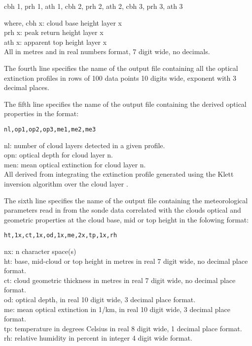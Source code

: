 \begin{center}
cbh 1, prh 1, ath 1, cbh 2, prh 2, ath 2, cbh 3, prh 3, ath 3
\end{center}
\noindent
where,
\noindent
cbh x: cloud base height layer x\\
prh x: peak return height layer x\\
ath x: apparent top height layer x\\

All in metres and in real numbers format, 7 digit wide, no decimals.

The fourth line specifies the name of the output file containing all
the optical extinction profiles in rows of 100 data points 10 digits
wide, exponent with 3 decimal places.

The fifth line specifies the name of the output file containing the
derived optical properties in the format:

\begin{center}
	{\tt nl,op1,op2,op3,me1,me2,me3}
\end{center}
\noindent
nl: number of cloud layers detected in a given profile.\\
opn: optical depth for cloud layer n.\\
men: mean optical extinction for cloud layer n.\\

All derived from integrating the extinction profile 
generated using the Klett inversion algorithm over the cloud
layer \cite{jdk1}. 

The sixth line specifies the name of the output file containing the
meteorological parameters read in from the sonde data
correlated with the clouds optical and geometric properties at the cloud
base, mid or top height in the folowing format:

\begin{center}
		{\tt ht,1x,ct,1x,od,1x,me,2x,tp,1x,rh}
\end{center}
\noindent
nx: n character space(s)\\
ht: base, mid-cloud or top height in metres in real 7 digit wide, 
no decimal place format.\\
ct: cloud geometric thickness in metres in real 7 digit wide, 
    no decimal place format.\\
od: optical depth, in real 10 digit wide, 3 decimal place format.\\
me: mean optical extinction in 1/km, in real 10 digit wide, 
    3 decimal place format.\\
tp: temperature in degrees Celsius in real 8 digit wide, 
    1 decimal place format.\\
rh: relative humidity in percent in integer 4 digit wide format.\\

